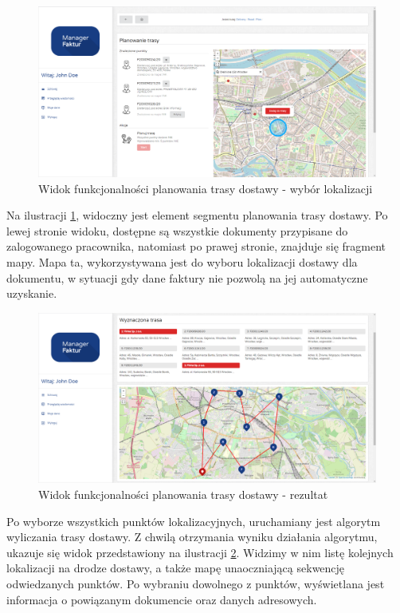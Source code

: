 \begin{figure}[ht]
 \centering
  \includegraphics[width=0.95\linewidth]{rys04/zrzut6}
 \caption{Widok funkcjonalności planowania trasy dostawy - wybór lokalizacji}
 \label{fig:gui-webowa-zrzut6}
\end{figure}

Na ilustracji \ref{fig:gui-webowa-zrzut6}, widoczny jest element segmentu planowania trasy dostawy. Po lewej stronie widoku, dostępne są wszystkie dokumenty przypisane do zalogowanego pracownika, natomiast po prawej stronie, znajduje się fragment mapy. Mapa ta, wykorzystywana jest do wyboru lokalizacji dostawy dla dokumentu, w sytuacji gdy dane faktury nie pozwolą na jej automatyczne uzyskanie.

\newpage

\begin{figure}[ht]
 \centering
  \includegraphics[width=0.95\linewidth]{rys04/zrzut7}
 \caption{Widok funkcjonalności planowania trasy dostawy - rezultat}
 \label{fig:gui-webowa-zrzut7}
\end{figure}

Po wyborze wszystkich punktów lokalizacyjnych, uruchamiany jest algorytm wyliczania trasy dostawy. Z chwilą otrzymania wyniku działania algorytmu, ukazuje się widok przedstawiony na ilustracji \ref{fig:gui-webowa-zrzut7}. Widzimy w nim listę kolejnych lokalizacji na drodze dostawy, a także mapę unaoczniającą sekwencję odwiedzanych punktów. Po wybraniu dowolnego z punktów, wyświetlana jest informacja o powiązanym dokumencie oraz danych adresowych.

